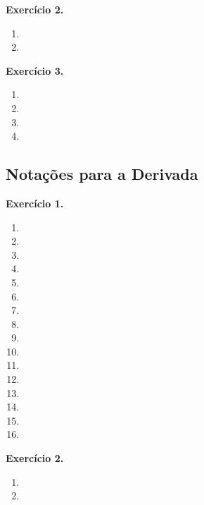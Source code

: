 \documentclass[12pt,a4paper]{article}
\begin{document}
\vspace{0.5cm}
\noindent\textbf{Exercício 2.}
\begin{enumerate}
    \renewcommand{\theenumi}{\alph{enumi}}
    \renewcommand{\labelenumi}{\theenumi)}
    \item 
    \item 
\end{enumerate}

\vspace{0.5cm}
\noindent\textbf{Exercício 3.}
\begin{enumerate}
    \renewcommand{\theenumi}{\alph{enumi}}
    \renewcommand{\labelenumi}{\theenumi)}
    \item 
    \item 
    \item 
    \item 
\end{enumerate}

\subsection{Notações para a Derivada}

\vspace{0.5cm}
\noindent\textbf{Exercício 1.}
\begin{enumerate}
    \renewcommand{\theenumi}{\alph{enumi}}
    \renewcommand{\labelenumi}{\theenumi)}
    \item 
    \item 
    \item 
    \item 
    \item 
    \item 
    \item 
    \item 
    \item 
    \item 
    \item 
    \item 
    \item 
    \item 
    \item 
    \item 
\end{enumerate}

\vspace{0.5cm}
\noindent\textbf{Exercício 2.}
\begin{enumerate}
    \renewcommand{\theenumi}{\alph{enumi}}
    \renewcommand{\labelenumi}{\theenumi)}
    \item 
    \item 
\end{enumerate}
\end{document}

